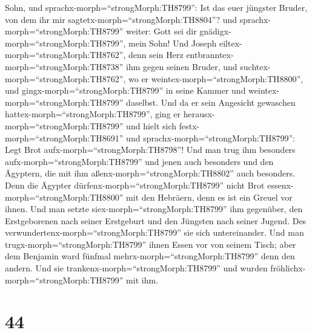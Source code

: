 Sohn, und sprachx-morph=``strongMorph:TH8799'': Ist das euer jüngster
Bruder, von dem ihr mir sagtetx-morph=``strongMorph:TH8804''? und
sprachx-morph=``strongMorph:TH8799'' weiter: Gott sei dir
gnädigx-morph=``strongMorph:TH8799'', mein Sohn!  Und
Joseph eiltex-morph=``strongMorph:TH8762'', denn sein Herz
entbranntex-morph=``strongMorph:TH8738'' ihm gegen seinen Bruder, und
suchtex-morph=``strongMorph:TH8762'', wo er
weintex-morph=``strongMorph:TH8800'', und
gingx-morph=``strongMorph:TH8799'' in seine Kammer und
weintex-morph=``strongMorph:TH8799'' daselbst.  Und da er
sein Angesicht gewaschen hattex-morph=``strongMorph:TH8799'', ging er
herausx-morph=``strongMorph:TH8799'' und hielt sich
festx-morph=``strongMorph:TH8691'' und
sprachx-morph=``strongMorph:TH8799'': Legt Brot
aufx-morph=``strongMorph:TH8798''!  Und man trug ihm
besonders aufx-morph=``strongMorph:TH8799'' und jenen auch besonders und
den Ägyptern, die mit ihm aßenx-morph=``strongMorph:TH8802'' auch
besonders. Denn die Ägypter dürfenx-morph=``strongMorph:TH8799'' nicht
Brot essenx-morph=``strongMorph:TH8800'' mit den Hebräern, denn es ist
ein Greuel vor ihnen.  Und man setzte
siex-morph=``strongMorph:TH8799'' ihm gegenüber, den Erstgeborenen nach
seiner Erstgeburt und den Jüngsten nach seiner Jugend. Des
verwundertenx-morph=``strongMorph:TH8799'' sie sich untereinander.
 Und man trugx-morph=``strongMorph:TH8799'' ihnen Essen vor
von seinem Tisch; aber dem Benjamin ward fünfmal
mehrx-morph=``strongMorph:TH8799'' denn den andern. Und sie
trankenx-morph=``strongMorph:TH8799'' und wurden
fröhlichx-morph=``strongMorph:TH8799'' mit ihm.

\hypertarget{section-43}{%
\section{44}\label{section-43}}

